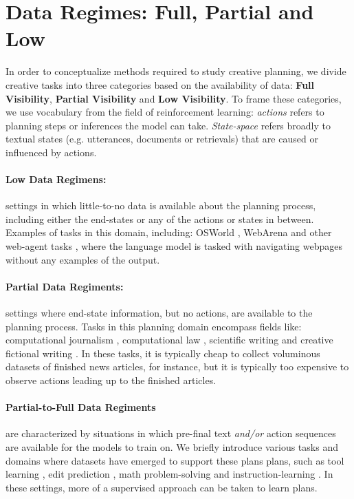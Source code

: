 \documentclass[11pt]{article}
\begin{document}
\section{Data Regimes: Full, Partial and Low}

In order to conceptualize methods required to study creative planning, we divide creative tasks into three categories based on the availability of data: \textbf{Full Visibility}, \textbf{Partial Visibility} and \textbf{Low Visibility}. To frame these categories, we use vocabulary from the field of reinforcement learning: \textit{actions} refers to planning steps or inferences the model can take. \textit{State-space} refers broadly to textual states (e.g. utterances, documents or retrievals) that are caused or influenced by actions.

\paragraph{Low Data Regimens:} settings in which little-to-no data is available about the planning process, including either the end-states or any of the actions or states in between. Examples of tasks in this domain, including: OSWorld \cite{xie2024osworldbenchmarkingmultimodalagents}, WebArena \cite{zhou2023webarena} and other web-agent tasks \cite{branavan-etal-2009-reinforcement, pmlr-v70-shi17a, zheran2018reinforcement, deng2023mind2web, kim2024language,gurreal}, where the language model is tasked with navigating webpages without any examples of the output.

\paragraph{Partial Data Regiments:} settings where end-state information, but no actions, are available to the planning process. Tasks in this planning domain encompass fields like: computational journalism \cite{spangher2024pressrelease}, computational law \cite{ravichander-etal-2019-question}, scientific writing \cite{si2024llmsgeneratenovelresearch} and creative fictional writing \cite{huang2023affective,tian2024large}. In these tasks, it is typically cheap to collect voluminous datasets of finished news articles, for instance, but it is typically too expensive to observe actions leading up to the finished articles.

\paragraph{Partial-to-Full Data Regiments} are characterized by situations in which pre-final text \textit{and/or} action sequences are available for the models to train on. We briefly introduce various tasks and domains where datasets have emerged to support these plans plans, such as tool learning \cite{schick2023toolformer, patil2023gorilla,qin2023toolllm,li2023apibank}, edit prediction \cite{spangher2022newsedits, lee2024patent}, math problem-solving \cite{cobbe2021training, hendrycks2021measuring} and instruction-learning \cite{wu2023learning, wu2022understanding}. In these settings, more of a supervised approach can be taken to learn plans.
\end{document}
